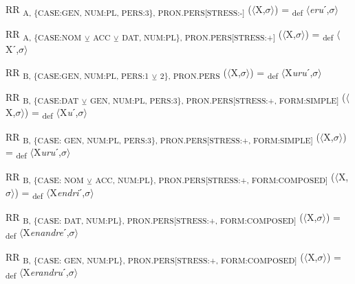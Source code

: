 {\begin{exe}
 RR \textsubscript{A, \{CASE:GEN, NUM:PL, PERS:3\}, PRON.PERS[STRESS:-]} ($\langle$X,$\sigma $$\rangle$) = \textsubscript{def} $\langle$\textit{eru}ˊ,$\sigma $$\rangle$
\end{exe}

\begin{exe}
 RR \textsubscript{A, \{CASE:NOM} \textsubscript{${\veebar}$}\textsubscript{ ACC} \textsubscript{${\veebar}$}\textsubscript{ DAT, NUM:PL\}, PRON.PERS[STRESS:+]} ($\langle$X,$\sigma $$\rangle$) = \textsubscript{def} $\langle$Xˊ,$\sigma $$\rangle$
\end{exe}

\begin{exe}
 RR \textsubscript{B, \{CASE:GEN, NUM:PL, PERS:1} \textsubscript{${\veebar}$}\textsubscript{ 2\}, PRON.PERS} ($\langle$X,$\sigma $$\rangle$) = \textsubscript{def} $\langle$X\textit{uru}ˊ,$\sigma $$\rangle$
\end{exe}

\begin{exe}
 RR \textsubscript{B, \{CASE:DAT} \textsubscript{${\veebar}$}\textsubscript{ GEN, NUM:PL, PERS:3\}, PRON.PERS[STRESS:+, FORM:SIMPLE]} ($\langle$X,$\sigma $$\rangle$) = \textsubscript{def} $\langle$X\textit{u}ˊ,$\sigma $$\rangle$
\end{exe}

\begin{exe}
 RR \textsubscript{B, \{CASE: GEN, NUM:PL, PERS:3\}, PRON.PERS[STRESS:+, FORM:SIMPLE]} ($\langle$X,$\sigma $$\rangle$) = \textsubscript{def} $\langle$X\textit{uru}ˊ,$\sigma $$\rangle$
\end{exe}

\begin{exe}
 RR \textsubscript{B, \{CASE: NOM} \textsubscript{${\veebar}$}\textsubscript{ ACC, NUM:PL\}, PRON.PERS[STRESS:+, FORM:COMPOSED]} ($\langle$X,$\sigma $$\rangle$) = \textsubscript{def} $\langle$X\textit{endri}ˊ,$\sigma $$\rangle$
\end{exe}

\begin{exe}
 RR \textsubscript{B, \{CASE: DAT, NUM:PL\}, PRON.PERS[STRESS:+, FORM:COMPOSED]} ($\langle$X,$\sigma $$\rangle$) = \textsubscript{def} $\langle$X\textit{enandre}ˊ,$\sigma $$\rangle$
\end{exe}

\begin{exe}
 RR \textsubscript{B, \{CASE: GEN, NUM:PL\}, PRON.PERS[STRESS:+, FORM:COMPOSED]} ($\langle$X,$\sigma $$\rangle$) = \textsubscript{def} $\langle$X\textit{erandru}ˊ,$\sigma $$\rangle$
\end{exe}

}
